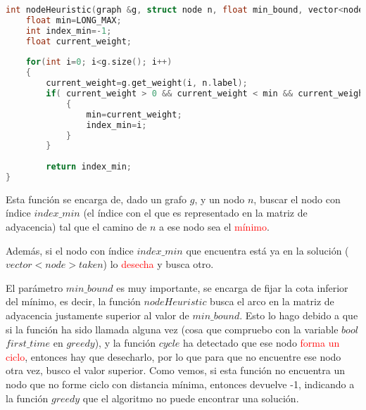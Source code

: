 \documentclass[11pt]{article}
\begin{document}
\begin{lstlisting}[language=C++, caption=Función de selección]
int nodeHeuristic(graph &g, struct node n, float min_bound, vector<node> taken){
	float min=LONG_MAX;
	int index_min=-1;
	float current_weight;
	
	for(int i=0; i<g.size(); i++)
	{
		current_weight=g.get_weight(i, n.label);
		if( current_weight > 0 && current_weight < min && current_weight > min_bound && !is_in(i, taken) )
			{
				min=current_weight;
				index_min=i;
			}        
		}
	
		return index_min;
}
\end{lstlisting}

Esta función se encarga de, dado un grafo $g$, y un nodo $n$, buscar el nodo con índice $index\_min$ (el índice con el que es representado en la matriz de adyacencia) tal que el camino de $n$ a ese nodo sea el \textcolor{red}{mínimo}.

Además, si el nodo con índice $index\_min$ que encuentra está ya en la solución ($vector<node> taken$) lo \textcolor{red}{desecha} y busca otro.

El parámetro $min\_bound$ es muy importante, se encarga de fijar la cota inferior del mínimo, es decir, la función $nodeHeuristic$ busca el arco en la matriz de adyacencia justamente superior al valor de $min\_bound$. Esto lo hago debido a que si la función ha sido llamada alguna vez (cosa que compruebo con la variable $bool$ $first\_time$ en $greedy$), y la función $cycle$ ha detectado que ese nodo \textcolor{red}{forma un ciclo}, entonces hay que desecharlo, por lo que para que no encuentre ese nodo otra vez, busco el valor superior.
Como vemos, si esta función no encuentra un nodo que no forme ciclo con distancia mínima, entonces devuelve -1, indicando a la función $greedy$ que el algoritmo no puede encontrar una solución.
\end{document}
